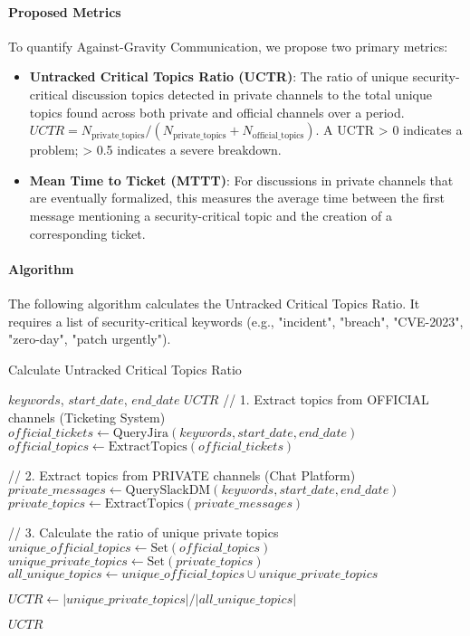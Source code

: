 \documentclass[11pt, a4paper]{article}
\begin{document}
\paragraph{Proposed Metrics}
To quantify Against-Gravity Communication, we propose two primary metrics:
\begin{itemize}
    \item \textbf{Untracked Critical Topics Ratio (UCTR)}: The ratio of unique security-critical discussion topics detected in private channels to the total unique topics found across both private and official channels over a period. \( UCTR = N_{\text{private\_topics}} / (N_{\text{private\_topics}} + N_{\text{official\_topics}}) \). A UCTR > 0 indicates a problem; > 0.5 indicates a severe breakdown.
    \item \textbf{Mean Time to Ticket (MTTT)}: For discussions in private channels that are eventually formalized, this measures the average time between the first message mentioning a security-critical topic and the creation of a corresponding ticket.
\end{itemize}

\paragraph{Algorithm}
The following algorithm calculates the Untracked Critical Topics Ratio. It requires a list of security-critical keywords (e.g., "incident", "breach", "CVE-2023", "zero-day", "patch urgently").

\begin{algorithm}[H]
\caption{Calculate Untracked Critical Topics Ratio}
\begin{algorithmic}[1]
\Require $keywords$, $start\_date$, $end\_date$
\Ensure $UCTR$
\State // 1. Extract topics from OFFICIAL channels (Ticketing System)
\State $official\_tickets \gets \text{QueryJira}(keywords, start\_date, end\_date)$
\State $official\_topics \gets \text{ExtractTopics}(official\_tickets)$ 

\State // 2. Extract topics from PRIVATE channels (Chat Platform)
\State $private\_messages \gets \text{QuerySlackDM}(keywords, start\_date, end\_date)$
\State $private\_topics \gets \text{ExtractTopics}(private\_messages)$

\State // 3. Calculate the ratio of unique private topics
\State $unique\_official\_topics \gets \text{Set}(official\_topics)$
\State $unique\_private\_topics \gets \text{Set}(private\_topics)$
\State $all\_unique\_topics \gets unique\_official\_topics \cup unique\_private\_topics$

\State $UCTR \gets |unique\_private\_topics| / |all\_unique\_topics|$

\State \Return $UCTR$
\end{algorithmic}
\end{algorithm}
\end{document}
